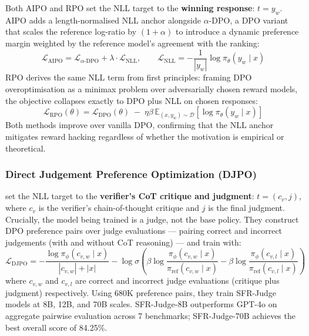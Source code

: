 \documentclass[11pt]{article}
\begin{document}
Both AIPO \autocite{shen2024aipoimprovingtrainingobjective} and RPO \autocite{liu2024provablymitigatingoveroptimizationrlhf} set the NLL target to the \textbf{winning response}: $t = y_w$. AIPO adds a length-normalised NLL anchor alongside $\alpha$-DPO, a DPO variant that scales the reference log-ratio by $(1+\alpha)$ to introduce a dynamic preference margin weighted by the reference model's agreement with the ranking:
\begin{equation}
    \mathcal{L}_{\text{AIPO}} = \mathcal{L}_{\alpha\text{-DPO}} + \lambda \cdot \mathcal{L}_{\text{NLL}}, \qquad \mathcal{L}_{\text{NLL}} = -\frac{1}{|y_w|}\log \pi_\theta(y_w \mid x)
    \label{eq:aipo}
\end{equation}
RPO derives the same NLL term from first principles: framing DPO overoptimisation as a minimax problem over adversarially chosen reward models, the objective collapses exactly to DPO plus NLL on chosen responses:
\begin{equation}
    \mathcal{L}_{\text{RPO}}(\theta) = \mathcal{L}_{\text{DPO}}(\theta) \;-\; \eta\beta\,\mathbb{E}_{(x,y_w)\sim\mathcal{D}}\!\left[\log \pi_\theta(y_w \mid x)\right]
    \label{eq:rpo}
\end{equation}
Both methods improve over vanilla DPO, confirming that the NLL anchor mitigates reward hacking regardless of whether the motivation is empirical or theoretical.

\subsubsection{Direct Judgement Preference Optimization (DJPO)}
\label{sec:djpo}

\autocite{wang2024directjudgementpreferenceoptimization} set the NLL target to the \textbf{verifier's CoT critique and judgment}: $t = (c_v, j)$, where $c_v$ is the verifier's chain-of-thought critique and $j$ is the final judgment. Crucially, the model being trained is a judge, not the base policy. They construct DPO preference pairs over judge evaluations --- pairing correct and incorrect judgements (with and without CoT reasoning) --- and train with:
\begin{equation}
    \mathcal{L}_{\text{DJPO}} = -\frac{\log \pi_\phi(c_{v,w} \mid x)}{|c_{v,w}| + |x|} - \log \sigma\!\left(\beta \log \frac{\pi_\phi(c_{v,w} \mid x)}{\pi_{\text{ref}}(c_{v,w} \mid x)} - \beta \log \frac{\pi_\phi(c_{v,l} \mid x)}{\pi_{\text{ref}}(c_{v,l} \mid x)}\right)
    \label{eq:djpo}
\end{equation}
where $c_{v,w}$ and $c_{v,l}$ are correct and incorrect judge evaluations (critique plus judgment) respectively. Using 680K preference pairs, they train SFR-Judge models at 8B, 12B, and 70B scales. SFR-Judge-8B outperforms GPT-4o on aggregate pairwise evaluation across 7 benchmarks; SFR-Judge-70B achieves the best overall score of 84.25\%.
\end{document}
